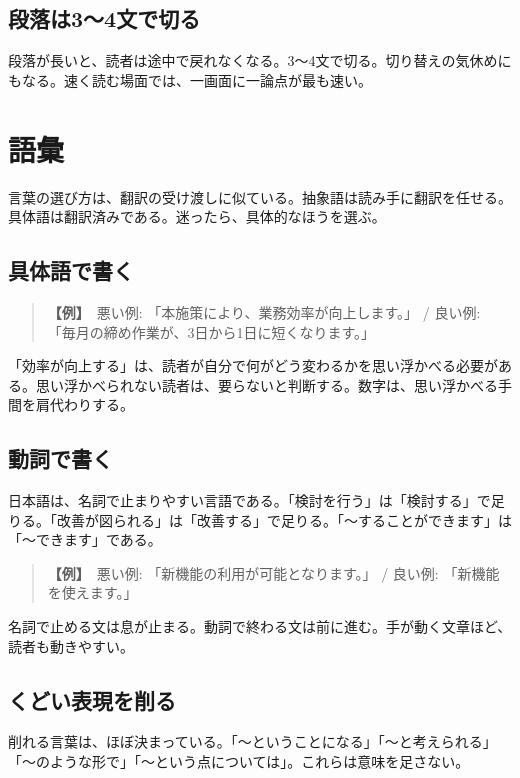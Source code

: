 \documentclass{article}
\begin{document}
\subsection{段落は3〜4文で切る}

段落が長いと、読者は途中で戻れなくなる。3〜4文で切る。切り替えの気休めにもなる。速く読む場面では、一画面に一論点が最も速い。

\section{語彙}

言葉の選び方は、翻訳の受け渡しに似ている。抽象語は読み手に翻訳を任せる。具体語は翻訳済みである。迷ったら、具体的なほうを選ぶ。

\subsection{具体語で書く}

\begin{quote}
\textbf{【例】}\ 悪い例: 「本施策により、業務効率が向上します。」 / 良い例: 「毎月の締め作業が、3日から1日に短くなります。」
\end{quote}

「効率が向上する」は、読者が自分で何がどう変わるかを思い浮かべる必要がある。思い浮かべられない読者は、要らないと判断する。数字は、思い浮かべる手間を肩代わりする。

\subsection{動詞で書く}

日本語は、名詞で止まりやすい言語である。「検討を行う」は「検討する」で足りる。「改善が図られる」は「改善する」で足りる。「〜することができます」は「〜できます」である。

\begin{quote}
\textbf{【例】}\ 悪い例: 「新機能の利用が可能となります。」 / 良い例: 「新機能を使えます。」
\end{quote}

名詞で止める文は息が止まる。動詞で終わる文は前に進む。手が動く文章ほど、読者も動きやすい。

\subsection{くどい表現を削る}

削れる言葉は、ほぼ決まっている。「〜ということになる」「〜と考えられる」「〜のような形で」「〜という点については」。これらは意味を足さない。
\end{document}
